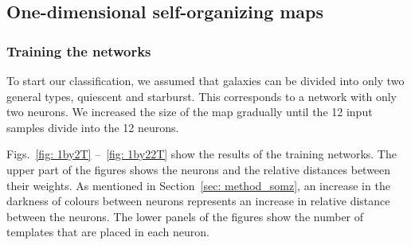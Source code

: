     \subsection{One-dimensional self-organizing maps}
    \label{sec: 1D_somz}
        \subsubsection{Training the networks}
        \label{sec: 1Dt}
            To start our classification, we assumed that galaxies can be divided into only two general types, quiescent and starburst.
            This corresponds to a network with only two neurons.
            We increased the size of the map gradually until the 12 input samples divide into the 12 neurons. 
        
            Figs.~\ref{fig: 1by2T} --~\ref{fig: 1by22T} show the results of the training networks.  %
            The upper part of the figures shows the neurons and the relative distances between their weights. 
            As mentioned in Section~\ref{sec: method_somz}, an increase in the darkness of colours between neurons represents an increase in relative distance between the neurons.
            The lower panels of the figures show the number of  templates that are placed in each neuron. 
